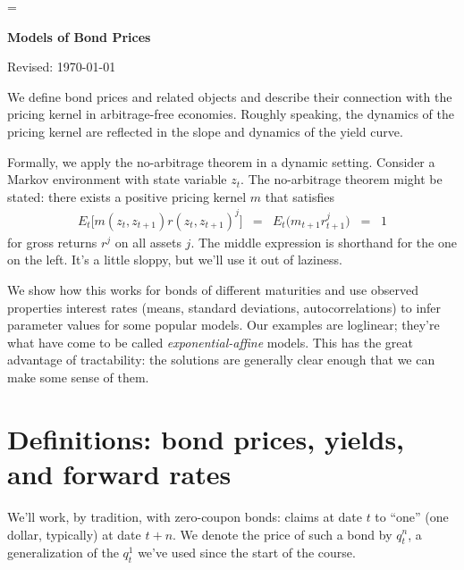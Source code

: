 \documentclass[11pt]{article}
\begin{document}
\parskip=\bigskipamount
\parindent=0.0in
\thispagestyle{empty}


\bigskip\bigskip
\centerline{\Large \bf Models of Bond Prices}
\centerline{Revised: \today}

\begin{comment}
This is clunky...

Bodie Kane and Marcus as example?
\end{comment}

\bigskip
We define bond prices and related objects
and describe their connection with the pricing kernel in arbitrage-free economies.
Roughly speaking, the dynamics of the pricing kernel are reflected in the
slope and dynamics of the yield curve.

Formally, we apply the no-arbitrage theorem in a dynamic setting.
Consider a Markov environment with state variable $z_t$.
The no-arbitrage theorem might be stated:
there exists a positive pricing kernel $m$ that satisfies
\begin{eqnarray}
    E_t \big[ m(z_t, z_{t+1}) r(z_t, z_{t+1})^j \big] &=&
    E_t \big( m_{t+1} r_{t+1}^j \big) \;\;=\;\; 1
    \label{eq:E(mr)=1}
\end{eqnarray}
for gross returns $r^j$ on all assets $j$.
The middle expression is shorthand for the one on the left.
It's a little sloppy, but we'll use it out of laziness.

We show how this works for bonds of different maturities
and use observed properties interest rates
(means, standard deviations, autocorrelations)
to infer parameter values for some popular models.
Our examples are loglinear; they're what have come to be
called {\it exponential-affine\/} models.
This has the great advantage of tractability:
the solutions are generally clear enough that we can make some
sense of them.


\section{Definitions:  bond prices, yields, and forward rates}


We'll work, by tradition, with zero-coupon bonds:
claims at date $t$ to ``one'' (one dollar, typically) at date $t+n$.
We denote the price of such a bond by $q^n_t$, a generalization
of the $q^1_t$ we've used since the start of the course.
\end{document}
